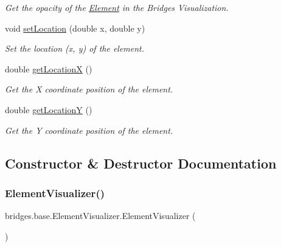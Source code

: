 \begin{DoxyCompactItemize}
\begin{DoxyCompactList}\small\item\em Get the opacity of the \mbox{\hyperlink{classbridges_1_1base_1_1_element}{Element}} in the Bridges Visualization. \end{DoxyCompactList}\item 
void \mbox{\hyperlink{classbridges_1_1base_1_1_element_visualizer_a04f3416447f2042de7cd21ce5b6a0598}{set\+Location}} (double x, double y)
\begin{DoxyCompactList}\small\item\em Set the location (x, y) of the element. \end{DoxyCompactList}\item 
double \mbox{\hyperlink{classbridges_1_1base_1_1_element_visualizer_aec8d0e757d323ff6122a2e05ab89f852}{get\+LocationX}} ()
\begin{DoxyCompactList}\small\item\em Get the X coordinate position of the element. \end{DoxyCompactList}\item 
double \mbox{\hyperlink{classbridges_1_1base_1_1_element_visualizer_ac170e945106f43cac3a3bdd950c60235}{get\+LocationY}} ()
\begin{DoxyCompactList}\small\item\em Get the Y coordinate position of the element. \end{DoxyCompactList}\end{DoxyCompactItemize}


\subsection{Constructor \& Destructor Documentation}
\mbox{\label{classbridges_1_1base_1_1_element_visualizer_acbca874876ec1e8dbbde6484a4fc056e}} 
\subsubsection{\texorpdfstring{ElementVisualizer()}{ElementVisualizer()}\hspace{0.1cm}{\footnotesize\ttfamily [1/6]}}
{\footnotesize\ttfamily bridges.\+base.\+Element\+Visualizer.\+Element\+Visualizer (\begin{DoxyParamCaption}{ }\end{DoxyParamCaption})}

